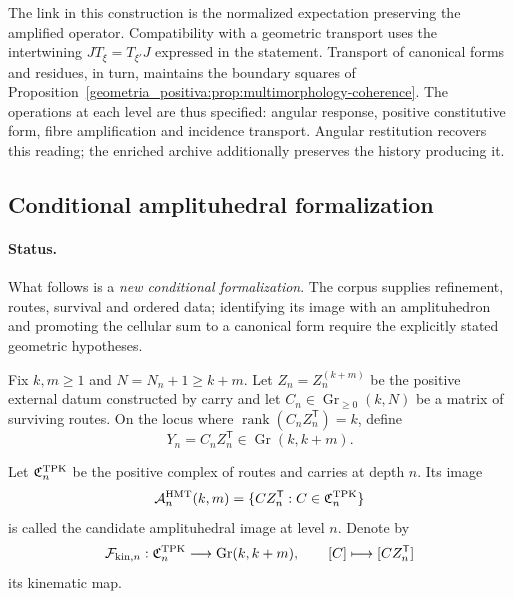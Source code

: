 The link in this construction is the normalized expectation preserving the amplified operator. Compatibility with a geometric transport uses the intertwining $JT_\xi=T_{\xi'}J$ expressed in the statement. Transport of canonical forms and residues, in turn, maintains the boundary squares of Proposition~\ref{geometria_positiva:prop:multimorphology-coherence}. The operations at each level are thus specified: angular response, positive constitutive form, fibre amplification and incidence transport. Angular restitution recovers this reading; the enriched archive additionally preserves the history producing it.

\subsection{Conditional amplituhedral formalization}

\paragraph{Status.}
What follows is a \emph{new conditional formalization}. The corpus supplies refinement, routes, survival and ordered data; identifying its image with an amplituhedron and promoting the cellular sum to a canonical form require the explicitly stated geometric hypotheses.

Fix \(k,m\ge1\) and \(N=N_n+1\ge k+m\). Let \(Z_n=Z_n^{(k+m)}\) be the positive external datum constructed by carry and let \(C_n\in\operatorname{Gr}_{\ge0}(k,N)\) be a matrix of surviving routes. On the locus where \(\operatorname{rank}(C_nZ_n^{\mathsf T})=k\), define
\begin{equation}
 Y_n=C_nZ_n^{\mathsf T}\in\operatorname{Gr}(k,k+m).
 \label{geometria_positiva:eq:hmt-amplituhedron-map}
\end{equation}

\begin{definition}
Let \(\mathfrak C_n^{\rm TPK}\) be the positive complex of routes and carries at depth \(n\). Its image
\[
 \mathcal A_n^{\rm HMT}(k,m)
 =\{C Z_n^{\mathsf T}:C\in\mathfrak C_n^{\rm TPK}\}
\]
is called the candidate amplituhedral image at level \(n\). Denote by
\[
 \mathcal F_{{\rm kin},n}:
 \mathfrak C_n^{\rm TPK}\longrightarrow
 \operatorname{Gr}(k,k+m),\qquad
 [C]\longmapsto[CZ_n^{\mathsf T}]
\]
its kinematic map.
\end{definition}

